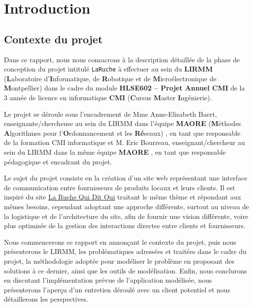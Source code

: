 \documentclass[a4paper,12pt]{report}
\theoremstyle{break}
\theoremstyle{break}
\theoremstyle{break}
\theoremstyle{break}
\theoremstyle{definition}
\theoremstyle{remark}
\begin{document}
\chapter{Introduction}
\setcounter{page}{1}
\section{Contexte du projet}
Dans ce rapport, nous nous consacrons à la description détaillée de la phase de conception du projet intitulé \texttt{LaRuche} à effectuer au sein du \textbf{LIRMM} (\textbf{L}aboratoire d'\textbf{I}nformatique, de \textbf{R}obotique et de \textbf{M}icroélectronique de \textbf{M}ontpellier) dans le cadre du module \textbf{HLSE602 -- Projet Annuel CMI} de la $3$\ieme{} année de licence en informatique \textbf{CMI} (\textbf{C}ursus \textbf{M}aster \textbf{I}ngénierie).

Le projet se déroule sous l'encadrement de Mme Anne-Elisabeth Baert, enseignante/chercheuse au sein du LIRMM dans l'équipe \textbf{MAORE} (\textbf{M}éthodes \textbf{A}lgorithmes pour l'\textbf{O}rdonnancement et les \textbf{Ré}seaux) \citep{AEBPres}, en tant que responsable de la formation CMI informatique et M. Eric Bourreau, enseignant/chercheur au sein du LIRMM dans la même équipe \textbf{MAORE} \citep{EricBourreauPres}, en tant que responsable pédagogique et encadrant du projet.

Le sujet du projet consiste en la création d'un site web représentant une interface de communication entre fournisseurs de produits locaux et leurs clients. Il est inspiré du site \og \href{https://laruchequiditoui.fr/fr}{La Ruche Qui Dit Oui} \fg traitant le même thème et répondant aux mêmes besoins, cependant adoptant une approche différente, surtout au niveau de la logistique et de l'architecture du site, afin de fournir une vision différente, voire plus optimisée de la gestion des interactions directes entre clients et fournisseurs.

Nous commencerons ce rapport en annonçant le contexte du projet, puis nous présenterons le LIRMM, les problématiques adressées et traitées dans le cadre du projet, la méthodologie adoptée pour modéliser le problème en proposant des solutions à ce dernier, ainsi que les outils de modélisation. Enfin, nous conclurons en discutant l'implémentation prévue de l'application modélisée, nous présenterons l'aperçu d'un entretien déroulé avec un client potentiel et nous détaillerons les perspectives.
\end{document}
